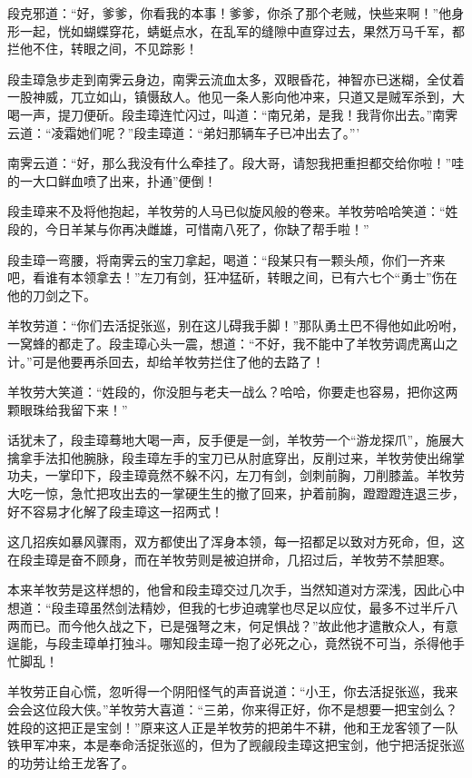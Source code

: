 \documentclass[12pt,oneside]{book}
\begin{document}
段克邪道：``好，爹爹，你看我的本事！爹爹，你杀了那个老贼，快些来啊！''他身形一起，恍如蝴蝶穿花，蜻蜓点水，在乱军的缝隙中直穿过去，果然万马千军，都拦他不住，转眼之间，不见踪影！

段圭璋急步走到南霁云身边，南霁云流血太多，双眼昏花，神智亦已迷糊，全仗着一股神威，兀立如山，镇慑敌人。他见一条人影向他冲来，只道又是贼军杀到，大喝一声，提刀便斫。段圭璋连忙闪过，叫道：``南兄弟，是我！我背你出去。''南霁云道：``凌霜她们呢？''段圭璋道：``弟妇那辆车子已冲出去了。'''

南霁云道：``好，那么我没有什么牵挂了。段大哥，请恕我把重担都交给你啦！''哇的一大口鲜血喷了出来，扑通''便倒！

段圭璋来不及将他抱起，羊牧劳的人马已似旋风般的卷来。羊牧劳哈哈笑道：``姓段的，今日羊某与你再决雌雄，可惜南八死了，你缺了帮手啦！''

段圭璋一弯腰，将南霁云的宝刀拿起，喝道：``段某只有一颗头颅，你们一齐来吧，看谁有本领拿去！''左刀有剑，狂冲猛斫，转眼之间，已有六七个``勇士''伤在他的刀剑之下。

羊牧劳道：``你们去活捉张巡，别在这儿碍我手脚！''那队勇土巴不得他如此吩咐，一窝蜂的都走了。段圭璋心头一震，想道：``不好，我不能中了羊牧劳调虎离山之计。''可是他要再杀回去，却给羊牧劳拦住了他的去路了！

羊牧劳大笑道：``姓段的，你没胆与老夫一战么？哈哈，你要走也容易，把你这两颗眼珠给我留下来！''

话犹未了，段圭璋蓦地大喝一声，反手便是一剑，羊牧劳一个``游龙探爪''，施展大擒拿手法扣他腕脉，段圭璋左手的宝刀已从肘底穿出，反削过来，羊牧劳使出绵掌功夫，一掌印下，段圭璋竟然不躲不闪，左刀有剑，剑刺前胸，刀削膝盖。羊牧劳大吃一惊，急忙把攻出去的一掌硬生生的撤了回来，护着前胸，蹬蹬蹬连退三步，好不容易才化解了段圭璋这一招两式！

这几招疾如暴风骤雨，双方都使出了浑身本领，每一招都足以致对方死命，但，这在段圭璋是奋不顾身，而在羊牧劳则是被迫拼命，几招过后，羊牧劳不禁胆寒。

本来羊牧劳是这样想的，他曾和段圭璋交过几次手，当然知道对方深浅，因此心中想道：``段圭璋虽然剑法精妙，但我的七步迫魂掌也尽足以应仗，最多不过半斤八两而已。而今他久战之下，已是强弩之末，何足惧战？''故此他才遣散众人，有意逞能，与段圭璋单打独斗。哪知段圭璋一抱了必死之心，竟然锐不可当，杀得他手忙脚乱！

羊牧劳正自心慌，忽听得一个阴阳怪气的声音说道：``小王，你去活捉张巡，我来会会这位段大侠。''羊牧劳大喜道：``三弟，你来得正好，你不是想要一把宝剑么？姓段的这把正是宝剑！''原来这人正是羊牧劳的把弟牛不耕，他和王龙客领了一队铁甲军冲来，本是奉命活捉张巡的，但为了觊觎段圭璋这把宝剑，他宁把活捉张巡的功劳让给王龙客了。
\end{document}

